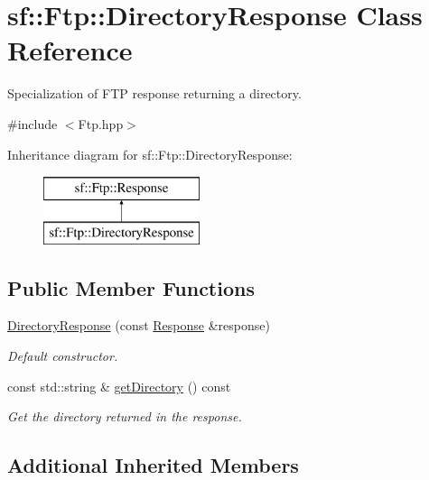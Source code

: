 \hypertarget{classsf_1_1_ftp_1_1_directory_response}{}\section{sf\+:\+:Ftp\+:\+:Directory\+Response Class Reference}
\label{classsf_1_1_ftp_1_1_directory_response}


Specialization of F\+TP response returning a directory.  




{\ttfamily \#include $<$Ftp.\+hpp$>$}

Inheritance diagram for sf\+:\+:Ftp\+:\+:Directory\+Response\+:\begin{figure}[H]
\begin{center}
\leavevmode
\includegraphics[height=2.000000cm]{classsf_1_1_ftp_1_1_directory_response}
\end{center}
\end{figure}
\subsection*{Public Member Functions}
\begin{DoxyCompactItemize}
\item 
\hyperlink{classsf_1_1_ftp_1_1_directory_response_a36b6d2728fa53c4ad37b7a6307f4d388}{Directory\+Response} (const \hyperlink{classsf_1_1_ftp_1_1_response}{Response} \&response)
\begin{DoxyCompactList}\small\item\em Default constructor. \end{DoxyCompactList}\item 
const std\+::string \& \hyperlink{classsf_1_1_ftp_1_1_directory_response_a311575c5c50905219025acfa73de67e2}{get\+Directory} () const
\begin{DoxyCompactList}\small\item\em Get the directory returned in the response. \end{DoxyCompactList}\end{DoxyCompactItemize}
\subsection*{Additional Inherited Members}


